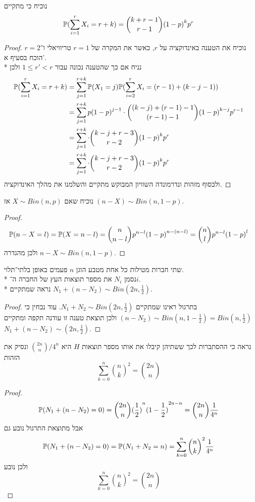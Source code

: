 \subquestion{}
נוכיח כי מתקיים
\[
	\mathbb{P}(\sum_{i = 1}^{r} X_i = r + k)
	= \binom{k + r - 1}{r - 1} {(1 - p)}^k p^r
\]
\begin{proof}
	נוכיח את הטענה באינדוקציה על $r$, כאשר את המקרה של $r = 1$ טריוויאלי ו־$r = 2$ הוכח בסעיף א'. \\*
	נניח אם כך שהטענה נכונה עבור $1 \le r' < r$ ולכן
	\begin{align*}
		\mathbb{P}(\sum_{i = 1}^{r} X_i = r + k)
		& = \sum_{j = 1}^{r + k} \mathbb{P}(X_1 = j) \mathbb{P}(\sum_{i = 2}^{r} X_i = (r - 1) + (k - j - 1)) \\
		& = \sum_{j = 1}^{r + k} p {(1 - p)}^{j - 1} \cdot \binom{(k - j) + (r - 1) - 1}{(r - 1) - 1} {(1 - p)}^{k - j} p^{r - 1} \\
		& = \sum_{j = 1}^{r + k} \cdot \binom{k - j + r - 3}{r - 2} {(1 - p)}^k p^r \\
		& = \sum_{j = 1}^{r + k} \cdot \binom{k - j + r - 3}{r - 2} {(1 - p)}^k p^r \\
	\end{align*}
	ולבסוף מזהות ונדרמונדה השוויון המבוקש מתקיים והשלמנו את מהלך האינדוקציה. 
\end{proof}

\question{}
\subquestion{}
נוכיח שאם $X \sim Bin(n, p)$ אז $(n - X) \sim Bin(n, 1 - p)$.
\begin{proof}
	\[
		\mathbb{P}(n - X = l)
		= \mathbb{P}(X = n - l)
		= \binom{n}{n - l} p^{n - l} {(1 - p)}^{n - (n - l)}
		= \binom{n}{l} p^{n - l} {(1 - p)}^{l}
	\]
	ולכן מהגדרה $n - X \sim Bin(n, 1 - p)$.
\end{proof}

\subquestion{}
שתי חברות מטילות כל אחת מטבע הוגן $n$ פעמים באופן בלתי־תלוי. \\*
נסמן $N_i$ את מספר תוצאות העץ של החברה ה־$i$. \\*
נראה שמתקיים $N_1 + (n - N_2) \sim Bin(2n, \frac{1}{2})$.
\begin{proof}
	בתרגול ראינו שמתקיים $N_1 + N_2 \sim Bin(2n, \frac{1}{2})$.
	עוד נבחין כי $(n - N_2) \sim Bin(n, 1 - \frac{1}{2}) = Bin(n, \frac{1}{2})$ ולכן תוצאת טענה זו עודנה תקפה ומתקיים $N_1 + (n - N_2) \sim (2n, \frac{1}{2})$.
\end{proof}

\subquestion{}
נראה כי ההסתברות לכך ששתיהן קיבלו את אותו מספר תוצאות $H$ היא $\binom{2n}{n} / 4^n$ ונסיק את הזהות
\[
	\sum_{k = 0}^{n} {\binom{n}{k}}^2 = \binom{2n}{n}
\]
\begin{proof}
	\[
		\mathbb{P}(N_1 + (n - N_2) = 0)
		= \binom{2n}{n} {(\frac{1}{2})}^n {(1 - \frac{1}{2})}^{2n - n}
		= \binom{2n}{n} \frac{1}{4^n}
	\]
	אבל מתוצאת התרגול נובע גם
	\[
		\mathbb{P}(N_1 + (n - N_2) = 0)
		= \mathbb{P}(N_1 + N_2 = n)
		= \sum_{k = 0}^{n} {\binom{n}{k}}^2 \frac{1}{4^n}
	\]
	ולכן נובע
	\[
		\sum_{k = 0}^{n} {\binom{n}{k}}^2 = \binom{2n}{n}
	\]
\end{proof}

